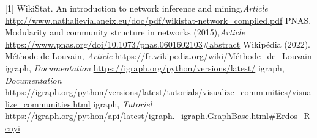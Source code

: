 \documentclass[frenchb]{report}
\newcommand{\1}{\mathbbm{1}}
\theoremstyle{definition}\newtheorem{defn}{Définition}
\theoremstyle{definition}\newtheorem{exm}{Exemple}
\theoremstyle{definition}\newtheorem{nota}{Notation}
\theoremstyle{definition}\newtheorem{rem}{Remarque}
\begin{document}
[1] WikiStat. An introduction to network inference and mining,\textit{Article}\newline
\url{http://www.nathalievialaneix.eu/doc/pdf/wikistat-network_compiled.pdf}\newline
\break
[2] PNAS. Modularity and community structure in networks (2015),\textit{Article}\newline
\url{https://www.pnas.org/doi/10.1073/pnas.0601602103#abstract} \newline
\break
[3] Wikipédia (2022). Méthode de Louvain, \textit{Article}\newline
\url{https://fr.wikipedia.org/wiki/Méthode_de_Louvain} \newline
\break
[4] igraph, \textit{Documentation}\newline
\url{https://igraph.org/python/versions/latest/}\newline
\break
[5] igraph, \textit{Documentation}\newline
\url{https://igraph.org/python/versions/latest/tutorials/visualize_communities/visualize_communities.html}
\break
[6] igraph, \textit{Tutoriel}\newline
\url{https://igraph.org/python/api/latest/igraph._igraph.GraphBase.html#Erdos_Renyi}
\end{document}
